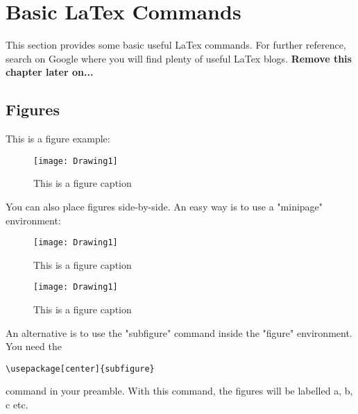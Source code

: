 \chapter{Basic LaTex Commands}
This section provides some basic useful LaTex commands. For further reference, search on Google where you will find plenty of useful LaTex blogs. \textbf{Remove this chapter later on...}

\section{Figures}

This is a figure example:

\begin{figure}[H] %
\centering
\texttt{[image: Drawing1]} %
\caption{This is a figure caption}
\label{fig:figure1_label}
\end{figure}

You can also place figures side-by-side. An easy way is to use a "minipage" environment:

\begin{minipage}[b]{0.45\linewidth}  %
\begin{figure}[H]
\centering
\texttt{[image: Drawing1]}
\caption{This is a figure caption}
\label{fig:figure2_label}
\end{figure}
\end{minipage}
\hspace{2mm} %
\begin{minipage}[b]{0.45\linewidth}
\begin{figure}[H]
\centering
\texttt{[image: Drawing1]}
\caption{This is a figure caption}
\label{fig:figure3_label}
\end{figure}
\end{minipage}

An alternative is to use the "subfigure" command inside the "figure" environment. You need the
\begin{verbatim}
\usepackage[center]{subfigure}
\end{verbatim}
command in your preamble. With this command, the figures will be labelled a, b, c etc.


